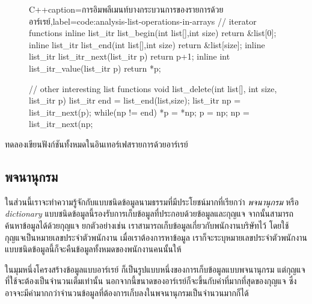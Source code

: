 \begin{figure}
\latintext
\begin{codelist}{C++}{caption={\thaitext การ{\wbr}อิม{\wbr}พลี{\wbr}เมนท์{\wbr}บาง{\wbr}กระบวนการ{\wbr}ของ{\wbr}รายการ{\wbr}ด้วย{\wbr}อาร์เรย์\latintext},label=code:analysis-list-operations-in-arrays}
// iterator functions
inline list_itr list_begin(int list[],int size) {return &list[0];}
inline list_itr list_end(int list[],int size) {return &list[size];}
inline list_itr list_itr_next(list_itr p) { return p+1; }
inline int list_itr_value(list_itr p) { return *p; }

// other interesting list functions
void list_delete(int list[], int size, list_itr p)
{
  list_itr end = list_end(list,size);
  list_itr np = list_itr_next(p);
  while(np != end) {
    *p = *np;
    p = np;
    np = list_itr_next(np;
  }
}
\end{codelist}
\thaitext
\end{figure}

\begin{quiz}{}
ทดลอง{\wbr}เขียน{\wbr}ฟังก์ชัน{\wbr}ทั้งหมด{\wbr}ใน{\wbr}อิน{\wbr}เทอร์เฟส{\wbr}รายการ{\wbr}ด้วย{\wbr}อาร์เรย์
\end{quiz}

\subsection{พจนานุกรม}
ใน{\wbr}ส่วน{\wbr}นี้{\wbr}เรา{\wbr}จะ{\wbr}ทำ{\wbr}ความ{\wbr}รู้จัก{\wbr}กับ{\wbr}แบบ{\wbr}ชนิด{\wbr}ข้อมูล{\wbr}นามธรรม{\wbr}ที่{\wbr}มี{\wbr}ประโยชน์{\wbr}มาก{\wbr}ที่{\wbr}เรียก{\wbr}ว่า {\em
  พจนานุกรม} หรือ {\em dictionary}
แบบ{\wbr}ชนิด{\wbr}ข้อมูล{\wbr}นี้{\wbr}รองรับ{\wbr}การ{\wbr}เก็บ{\wbr}ข้อมูล{\wbr}ที่{\wbr}ประกอบ{\wbr}ด้วย{\wbr}ข้อมูล{\wbr}และ{\wbr}กุญแจ{\wbr}
จากนั้น{\wbr}สามารถ{\wbr}ค้นหา{\wbr}ข้อมูล{\wbr}ได้{\wbr}ด้วย{\wbr}กุญแจ ยก{\wbr}ตัวอย่าง{\wbr}เช่น{\wbr}
เรา{\wbr}สามารถ{\wbr}เก็บ{\wbr}ข้อมูล{\wbr}เกี่ยวกับ{\wbr}พนักงาน{\wbr}บริษัท{\wbr}ไว้ โดย{\wbr}ใช้{\wbr}กุญแจ{\wbr}เป็น{\wbr}หมายเลข{\wbr}ประจำตัว{\wbr}พนักงาน{\wbr}
เมื่อ{\wbr}เรา{\wbr}ต้องการ{\wbr}หา{\wbr}ข้อมูล เรา{\wbr}ก็{\wbr}จะ{\wbr}ระบุ{\wbr}หมายเลข{\wbr}ประจำตัว{\wbr}พนักงาน{\wbr}
แบบ{\wbr}ชนิด{\wbr}ข้อมูล{\wbr}นี้{\wbr}ก็{\wbr}จะ{\wbr}คืน{\wbr}ข้อมูล{\wbr}ทั้งหมด{\wbr}ของ{\wbr}พนักงาน{\wbr}คน{\wbr}นั้น{\wbr}ให้{\wbr}

ใน{\wbr}มุม{\wbr}หนึ่ง{\wbr}โครงสร้าง{\wbr}ข้อมูล{\wbr}แบบ{\wbr}อาร์เรย์ ก็{\wbr}เป็น{\wbr}รูปแบบ{\wbr}หนึ่ง{\wbr}ของ{\wbr}การ{\wbr}เก็บ{\wbr}ข้อมูล{\wbr}แบบ{\wbr}พจนานุกรม{\wbr}
แต่{\wbr}กุญแจ{\wbr}ที่{\wbr}ใช้{\wbr}จะ{\wbr}ต้อง{\wbr}เป็น{\wbr}จำนวนเต็ม{\wbr}เท่านั้น{\wbr}
นอกจากนี้{\wbr}ขนาด{\wbr}ของ{\wbr}อาร์เรย์{\wbr}ก็{\wbr}จะ{\wbr}ขึ้น{\wbr}กับ{\wbr}ค่า{\wbr}ที่{\wbr}มาก{\wbr}ที่สุด{\wbr}ของ{\wbr}กุญแจ{\wbr}
ซึ่ง{\wbr}อาจ{\wbr}จะ{\wbr}มี{\wbr}ค่า{\wbr}มาก{\wbr}กว่า{\wbr}จำนวน{\wbr}ข้อมูล{\wbr}ที่{\wbr}ต้องการ{\wbr}เก็บ{\wbr}ลง{\wbr}ใน{\wbr}พจนานุกรม{\wbr}เป็น{\wbr}จำนวน{\wbr}มาก{\wbr}ก็ได้{\wbr}

